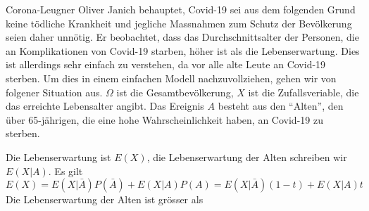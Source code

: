 Corona-Leugner Oliver Janich behauptet, Covid-19 sei aus dem folgenden
Grund keine tödliche Krankheit und jegliche Massnahmen zum Schutz
der Bevölkerung seien daher unnötig.
Er beobachtet, dass das Durchschnittsalter der Personen, die an
Komplikationen von Covid-19 starben, höher ist als die Lebenserwartung.
Dies ist allerdings sehr einfach zu verstehen, da vor alle alte Leute 
an Covid-19 sterben.
Um dies in einem einfachen Modell nachzuvollziehen, gehen wir von
folgener Situation aus.
$\Omega$ ist die Gesamtbevölkerung, $X$ ist die Zufallsveriable,
die das erreichte Lebensalter angibt.
Das Ereignis $A$ besteht aus den ``Alten'', den über 65-jährigen,
die eine hohe Wahrscheinlichkeit haben, an Covid-19 zu sterben.

Die Lebenserwartung ist $E(X)$, die Lebenserwartung der Alten schreiben
wir $E(X|A)$. 
Es gilt
\[
E(X) = E(X|\bar{A}) P(\bar{A}) + E(X|A) P(A)
=
E(X|\bar{A}) (1-t) + E(X|A) t
\]
Die Lebenserwartung der Alten ist grösser als 


\begin{loesung}
\end{loesung}

